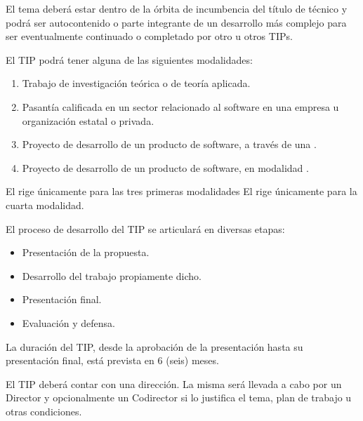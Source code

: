 \articulo El tema deberá estar dentro de la órbita de incumbencia del título de técnico y
podrá ser autocontenido o parte integrante de un desarrollo más complejo para ser
eventualmente continuado o completado por otro u otros TIPs.

\articulo El TIP podrá tener alguna de las siguientes modalidades:
\begin{enumerate}
\item Trabajo de investigación teórica o de teoría aplicada.
\item Pasantía calificada en un sector relacionado al software en una
empresa u organización estatal o privada.
\item Proyecto de desarrollo de un producto de software, a través de una
\modoTutorado.
\item Proyecto de desarrollo de un producto de software, en modalidad \modoCursada.
\end{enumerate}


El \capTradicional rige únicamente para las tres primeras modalidades
El \capCursada rige únicamente para la cuarta modalidad.




\articulo El proceso de desarrollo del TIP se articulará en diversas etapas:
\begin{itemize}
 \item Presentación de la propuesta.
 \item Desarrollo del trabajo propiamente dicho.
 \item Presentación final.
 \item Evaluación y defensa.
\end{itemize}

\articulo La duración del TIP, desde la aprobación de la presentación hasta
su presentación final, está prevista en 6 (seis) meses. 


\articulo El TIP deberá contar con una dirección. La misma será llevada a
cabo por un Director y opcionalmente un Codirector si lo justifica el tema, plan de
trabajo u otras condiciones.

